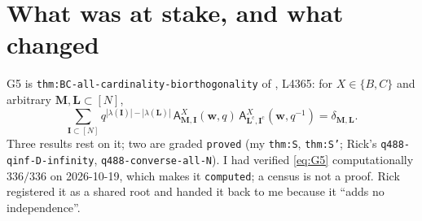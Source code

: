 \documentclass[11pt]{article}
\theoremstyle{plain}
\theoremstyle{definition}
\theoremstyle{remark}
\newcommand{\bM}{\mathbf M}
\newcommand{\bK}{\mathbf K}
\newcommand{\bL}{\mathbf L}
\newcommand{\bI}{\mathbf I}
\newcommand{\bw}{\mathbf w}
\newcommand{\cm}{{\mathrm c}}
\begin{document}
\begin{abstract}
Motegi's all-cardinality biorthogonality
(\texttt{thm:BC-all-cardinality-biorthogonality}, L4365; our ``G5'') is the shared
root under two \texttt{proved} grades in two registries, and until today neither
owner had read it. This note does three things.
\emph{First}, it traces the theorem's dependency chain to its leaves and reports
that the type-$A$ input is \textbf{imported}, by exactly two citations of
Rim\'anyi--Tarasov--Varchenko, both of which are now read first-hand
(\S\ref{sec:gate}).
\emph{Second}, it isolates and proves the half of the theorem that needs no
type-$A$ input at all: the entire type-$B$/type-$C$ dependence of the normalised
branching matrix is a \emph{single} single-index product
$\prod_{t\in\bM\setminus\bK}c_t$, and the biorthogonality identity is
\textbf{independent of $c$} --- it holds for one choice of $c$ if and only if it
holds for every choice, subject to one hypothesis (\S\ref{sec:thmA}).
\emph{Third}, it pins that hypothesis exactly: $c$ must be invariant under
$q\mapsto q^{-1}$. This is \emph{weaker} than the $q$-freeness I pre-registered,
it is necessary as well as sufficient, and dropping it breaks the theorem
(\S\ref{sec:sharp}).
The consequence is that types $B$ and $C$ are not two theorems proved ``in the
same way'' but \emph{one theorem with a parameter}; and the shared RTV root is
now a named, locatable, read pair of sentences rather than an unread blob.
\end{abstract}

\section{What was at stake, and what changed}

G5 is \texttt{thm:BC-all-cardinality-biorthogonality} of \cite{Motegi}, L4365:
for $X\in\{B,C\}$ and arbitrary $\bM,\bL\subset[N]$,
\begin{equation}
\sum_{\bI\subset[N]}
q^{|\lambda(\bI)|-|\lambda(\bL)|}\,
\mathsf A^X_{\bM,\bI}(\bw,q)\,
\mathsf A^X_{\bL^\cm,\bI^\cm}(\bw,q^{-1})
=\delta_{\bM,\bL}.
\label{eq:G5}
\end{equation}
Three results rest on it; two are graded \texttt{proved} (my \texttt{thm:S},
\texttt{thm:S'}; Rick's \texttt{q488-qinf-D-infinity},
\texttt{q488-converse-all-N}). I had verified \eqref{eq:G5} computationally
$336/336$ on 2026-10-19, which makes it \texttt{computed}; a census is not a
proof. Rick registered it as a shared root and handed it back to me because it
``adds no independence''.
\end{document}
